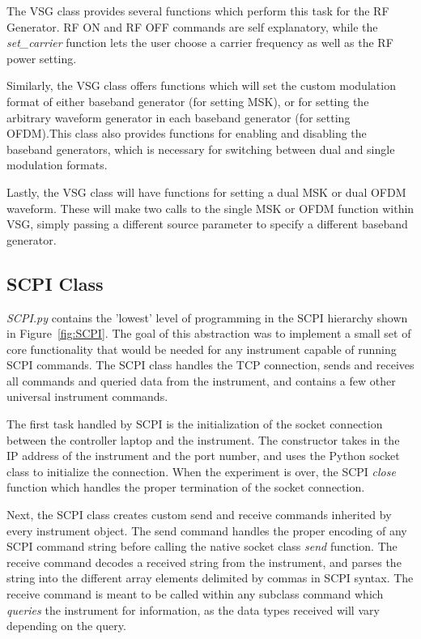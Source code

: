 The VSG class provides several functions which perform this task for the RF Generator. RF ON and RF OFF commands are self explanatory, while the \textit{set\_carrier} function lets the user choose a carrier frequency as well as the RF power setting.

Similarly, the VSG class offers functions which will set the custom modulation format of either baseband generator (for setting MSK), or for setting the arbitrary waveform generator in each baseband generator (for setting OFDM).This class also provides functions for enabling and disabling the baseband generators, which is necessary for switching between dual and single modulation formats. 

Lastly, the VSG class will have functions for setting a dual MSK or dual OFDM waveform. These will make two calls to the single MSK or OFDM function within VSG, simply passing a different source parameter to specify a different baseband generator.  
\subsection{SCPI Class}
\textit{SCPI.py} contains the 'lowest' level of programming in the SCPI hierarchy shown in Figure~\ref{fig:SCPI}. The goal of this abstraction was to implement a small set of core functionality that would be needed for any instrument capable of running SCPI commands. The SCPI class handles the TCP connection, sends and receives all commands and queried data from the instrument, and contains a few other universal instrument commands. 

The first task handled by SCPI is the initialization of the socket connection between the controller laptop and the instrument. The constructor takes in the IP address of the instrument and the port number, and uses the Python socket class to initialize the connection. When the experiment is over, the SCPI \textit{close} function which handles the proper termination of the socket connection. 

Next, the SCPI class creates custom send and receive commands inherited by every instrument object. The send command handles the proper encoding of any SCPI command string before calling the native socket class \textit{send} function. The receive command decodes a received string from the instrument, and parses the string into the different array elements delimited by commas in SCPI syntax. The receive command is meant to be called within any subclass command which \textit{queries} the instrument for information, as the data types received will vary depending on the query. 


